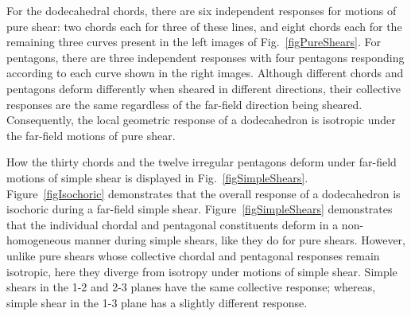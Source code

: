For the dodecahedral chords, there are six independent responses for motions of pure shear: two chords each for three of these lines, and eight chords each for the remaining three curves present in the left images of Fig.~\ref{figPureShears}.  For pentagons, there are three independent responses with four pentagons responding according to each curve shown in the right images.  Although different chords and pentagons deform differently when sheared in different directions, their collective responses are the same regardless of the far-field direction being sheared.  Consequently, the local geometric response of a dodecahedron is isotropic under the far-field motions of pure shear.  

How the thirty chords and the twelve irregular pentagons deform under far-field motions of simple shear is displayed in Fig.~\ref{figSimpleShears}.  Figure~\ref{figIsochoric} demonstrates that the overall response of a dodecahedron is isochoric during a far-field simple shear. Figure~\ref{figSimpleShears} demonstrates that the individual chordal and pentagonal constituents deform in a non-homogeneous manner during simple shears, like they do for pure shears.  However, unlike pure shears whose collective chordal and pentagonal responses remain isotropic, here they diverge from isotropy under motions of simple shear.  Simple shears in the 1-2 and 2-3 planes have the same collective response; whereas, simple shear in the 1-3 plane has a slightly different response.  

